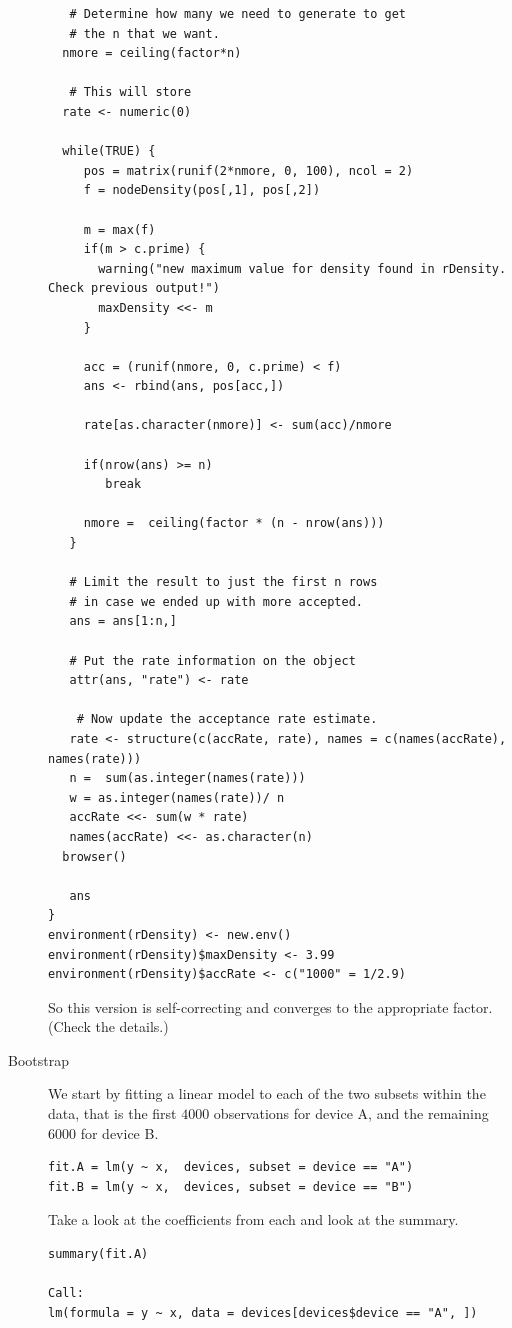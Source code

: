 \documentclass{article}
\begin{document}
\begin{description}
\begin{verbatim}
   # Determine how many we need to generate to get
   # the n that we want. 
  nmore = ceiling(factor*n)

   # This will store 
  rate <- numeric(0)
  
  while(TRUE) {
     pos = matrix(runif(2*nmore, 0, 100), ncol = 2)
     f = nodeDensity(pos[,1], pos[,2])
     
     m = max(f)
     if(m > c.prime) { 
       warning("new maximum value for density found in rDensity. Check previous output!")
       maxDensity <<- m
     }

     acc = (runif(nmore, 0, c.prime) < f)
     ans <- rbind(ans, pos[acc,])

     rate[as.character(nmore)] <- sum(acc)/nmore
     
     if(nrow(ans) >= n)
        break

     nmore =  ceiling(factor * (n - nrow(ans)))
   }

   # Limit the result to just the first n rows
   # in case we ended up with more accepted.
   ans = ans[1:n,]

   # Put the rate information on the object
   attr(ans, "rate") <- rate

    # Now update the acceptance rate estimate.
   rate <- structure(c(accRate, rate), names = c(names(accRate), names(rate)))
   n =  sum(as.integer(names(rate)))
   w = as.integer(names(rate))/ n
   accRate <<- sum(w * rate)
   names(accRate) <<- as.character(n)
  browser()

   ans
}
environment(rDensity) <- new.env()
environment(rDensity)$maxDensity <- 3.99
environment(rDensity)$accRate <- c("1000" = 1/2.9)
\end{verbatim}

So this version is self-correcting and converges to the appropriate factor.
(Check the details.)


\item[Bootstrap]
We start by fitting a linear model to each of the two subsets
within the data, that is the first $4000$ observations for
device A, and the remaining $6000$ for device B.
\begin{verbatim}
fit.A = lm(y ~ x,  devices, subset = device == "A")
fit.B = lm(y ~ x,  devices, subset = device == "B")
\end{verbatim}
Take a look at the coefficients from each
and look at the summary.
\begin{verbatim}
summary(fit.A)

Call:
lm(formula = y ~ x, data = devices[devices$device == "A", ])


\end{verbatim}
\end{description}
\end{document}
